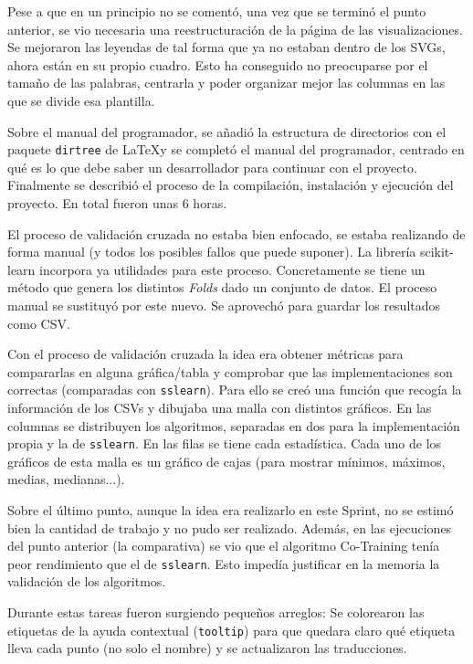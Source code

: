 Pese a que en un principio no se comentó, una vez que se terminó el punto
anterior, se vio necesaria una reestructuración de la página de las
visualizaciones. Se mejoraron las leyendas de tal forma que ya no estaban dentro
de los SVGs, ahora están en su propio cuadro. Esto ha conseguido no preocuparse
por el tamaño de las palabras, centrarla y poder organizar mejor las columnas en
las que se divide esa plantilla.

Sobre el manual del programador, se añadió la estructura de directorios con el
paquete \texttt{dirtree} de \LaTeX y se completó el manual del programador,
centrado en qué es lo que debe saber un desarrollador para continuar con el
proyecto. Finalmente se describió el proceso de la compilación, instalación y
ejecución del proyecto. En total fueron unas 6 horas.

El proceso de validación cruzada no estaba bien enfocado, se estaba realizando
de forma manual (y todos los posibles fallos que puede suponer). La librería
scikit-learn incorpora ya utilidades para este proceso. Concretamente se tiene
un método que genera los distintos \textit{Folds} dado un conjunto de datos. El
proceso manual se sustituyó por este nuevo. Se aprovechó para guardar los
resultados como CSV.

Con el proceso de validación cruzada la idea era obtener métricas para
compararlas en alguna gráfica/tabla y comprobar que las implementaciones son
correctas (comparadas con \texttt{sslearn}). Para ello se creó una función que
recogía la información de los CSVs y dibujaba una malla con distintos gráficos.
En las columnas se distribuyen los algoritmos, separadas en dos para la
implementación propia y la de \texttt{sslearn}. En las filas se tiene cada
estadística. Cada uno de los gráficos de esta malla es un gráfico de cajas (para
mostrar mínimos, máximos, medias, medianas...).

Sobre el último punto, aunque la idea era realizarlo en este Sprint, no se
estimó bien la cantidad de trabajo y no pudo ser realizado. Además, en las
ejecuciones del punto anterior (la comparativa) se vio que el algoritmo
Co-Training tenía peor rendimiento que el de \texttt{sslearn}. Esto impedía
justificar en la memoria la validación de los algoritmos.

Durante estas tareas fueron surgiendo pequeños arreglos: Se colorearon las
etiquetas de la ayuda contextual (\texttt{tooltip}) para que quedara claro qué
etiqueta lleva cada punto (no solo el nombre) y se actualizaron las
traducciones.

